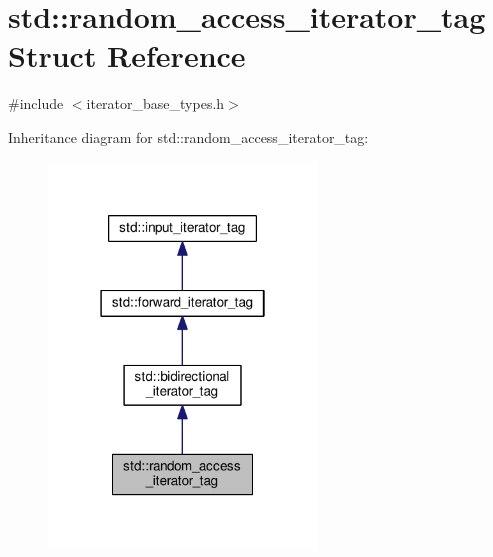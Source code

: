 \hypertarget{structstd_1_1random__access__iterator__tag}{}\section{std\+:\+:random\+\_\+access\+\_\+iterator\+\_\+tag Struct Reference}
\label{structstd_1_1random__access__iterator__tag}


{\ttfamily \#include $<$iterator\+\_\+base\+\_\+types.\+h$>$}



Inheritance diagram for std\+:\+:random\+\_\+access\+\_\+iterator\+\_\+tag\+:
\nopagebreak
\begin{figure}[H]
\begin{center}
\leavevmode
\includegraphics[width=202pt]{structstd_1_1random__access__iterator__tag__inherit__graph}
\end{center}
\end{figure}



